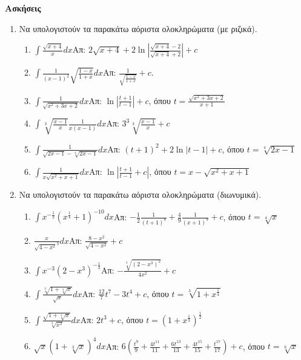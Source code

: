 \documentclass[a4paper,12pt]{article}
\begin{document}
\thispagestyle{empty}
\begin{center}
\end{center}

\vspace{2\baselineskip}

{\Large \bfseries Ασκήσεις}
\begin{enumerate}
\item Να υπολογιστούν τα παρακάτω αόριστα ολοκληρώματα (με ριζικά).
\begin{enumerate}
\item $\int\frac{\sqrt{x+4}}{x}dx$\hfill Απ: $2\sqrt{x+4}+2\ln\left|\frac{\sqrt{x+4}-2}{\sqrt{x+4}+2}\right|+c$
\item $\int\frac{1}{(x-1)^2}\sqrt{\frac{1-x}{1+x}}dx$\hfill Απ: $\frac{1}{\sqrt{\frac{1-x}{1+x}}}+c$.
\item $\int\frac{1}{\sqrt{x^2+3x+2}}dx$\hfill Απ: $\ln\left|\frac{t+1}{t-1}\right|+c$, όπου $t=\frac{\sqrt{x^2+3x+2}}{x+1}$
\item $\int\sqrt[3]{\frac{x-1}{x}}\frac{1}{x(x-1)}dx$\hfill Απ: $3^3\sqrt[3]{\frac{x-1}{x}} +c$
\item $\int\frac{1}{\sqrt{2x-1}-\sqrt[4]{2x-1}}dx$\hfill Απ: $(t+1)^2 +2\ln|t-1|+c$, όπου $t=\sqrt[4]{2x-1}$
\item $\int\frac{1}{x\sqrt{x^2+x+1}}dx$\hfill Απ: $\ln\left|\frac{t+1}{t-1}+c\right|$, όπου $t=x-\sqrt{x^2+x+1}$
\end{enumerate}

\item Να υπολογιστούν τα παρακάτω αόριστα ολοκληρώματα (διωνυμικά).
\begin{enumerate}
\item $\int x^{-\frac{1}{2}}(x^{\frac{1}{4}}+1)^{-10}dx$\hfill Απ: $-\frac{1}{2}\frac{1}{(t+1)^8}+\frac{4}{9}\frac{1}{(x+1)^9}+c$, όπου $t=\sqrt[4]{x}$
\item $\frac{x}{\sqrt{4-x^2}^3}dx$\hfill Απ: $\frac{8-x^2}{\sqrt{4-x^2}}+c$
\item $\int x^{-3}(2-x^3)^{-\frac{1}{3}}$\hfill Απ: $-\frac{\sqrt[3]{(2-x^3)^2}}{4x^2}+c$
\item $\int\frac{\sqrt[3]{1+\sqrt[4]{x}}}{\sqrt{x}}dx$\hfill Απ: $\frac{12}{7}t^7-3t^4+c$, όπου $t=\sqrt[3]{1+x^{\frac{1}{4}}}$
\item $\int \frac{\sqrt{1+\sqrt[3]{x}}}{\sqrt[3]{x^2}}dx$\hfill Απ: $2t^3+c$, όπου $t=(1+x^{\frac{1}{3}})^{\frac{1}{2}}$
\item $\sqrt{x}(1+\sqrt[3]{x})^4dx$\hfill Απ: $6(\frac{t^9}{9}+\frac{4t^{11}}{11}+\frac{6t^{13}}{13}+\frac{4t^{15}}{15}+\frac{t^{17}}{17})+c$, όπου $t=\sqrt[6]{x}$
\end{enumerate}


\end{enumerate}
\end{document}
